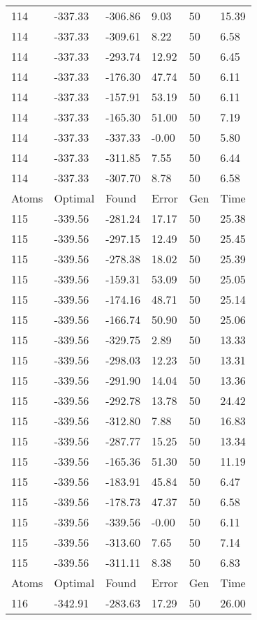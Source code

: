 \documentclass{report}
\begin{document}
\begin{appendix}
\begin{longtable}{llllll}
114 & -337.33 & -306.86 & 9.03 & 50 & 15.39 \\
114 & -337.33 & -309.61 & 8.22 & 50 & 6.58 \\
114 & -337.33 & -293.74 & 12.92 & 50 & 6.45 \\
114 & -337.33 & -176.30 & 47.74 & 50 & 6.11 \\
114 & -337.33 & -157.91 & 53.19 & 50 & 6.11 \\
114 & -337.33 & -165.30 & 51.00 & 50 & 7.19 \\
114 & -337.33 & -337.33 & -0.00 & 50 & 5.80 \\
114 & -337.33 & -311.85 & 7.55 & 50 & 6.44 \\
114 & -337.33 & -307.70 & 8.78 & 50 & 6.58 \\
Atoms & Optimal & Found & Error & Gen & Time \\
115 & -339.56 & -281.24 & 17.17 & 50 & 25.38 \\
115 & -339.56 & -297.15 & 12.49 & 50 & 25.45 \\
115 & -339.56 & -278.38 & 18.02 & 50 & 25.39 \\
115 & -339.56 & -159.31 & 53.09 & 50 & 25.05 \\
115 & -339.56 & -174.16 & 48.71 & 50 & 25.14 \\
115 & -339.56 & -166.74 & 50.90 & 50 & 25.06 \\
115 & -339.56 & -329.75 & 2.89 & 50 & 13.33 \\
115 & -339.56 & -298.03 & 12.23 & 50 & 13.31 \\
115 & -339.56 & -291.90 & 14.04 & 50 & 13.36 \\
115 & -339.56 & -292.78 & 13.78 & 50 & 24.42 \\
115 & -339.56 & -312.80 & 7.88 & 50 & 16.83 \\
115 & -339.56 & -287.77 & 15.25 & 50 & 13.34 \\
115 & -339.56 & -165.36 & 51.30 & 50 & 11.19 \\
115 & -339.56 & -183.91 & 45.84 & 50 & 6.47 \\
115 & -339.56 & -178.73 & 47.37 & 50 & 6.58 \\
115 & -339.56 & -339.56 & -0.00 & 50 & 6.11 \\
115 & -339.56 & -313.60 & 7.65 & 50 & 7.14 \\
115 & -339.56 & -311.11 & 8.38 & 50 & 6.83 \\
Atoms & Optimal & Found & Error & Gen & Time \\
116 & -342.91 & -283.63 & 17.29 & 50 & 26.00 \\

\end{longtable}
\end{appendix}
\end{document}

